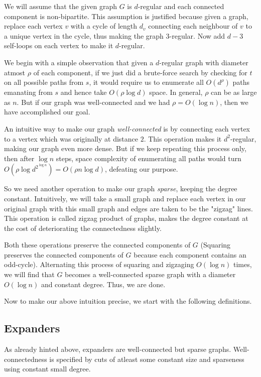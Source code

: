 \documentclass[10pt]{article}
\theoremstyle{plain}
\theoremstyle{definition}
\begin{document}
We will assume that the given graph $G$ is $d$-regular and each connected component is non-bipartite. This assumption is justified because given a graph, replace each vertex $v$ with a cycle of length $d_v$ connecting each neighbour of $v$ to a unique vertex in the cycle, thus making the graph $3$-regular. Now add $d-3$ self-loops on each vertex to make it $d$-regular.

We begin with a simple observation that given a $d$-regular graph with diameter atmost $\rho$ of each component, if we just did a brute-force search by checking for $t$ on all possible paths from $s$, it would require us to enumerate all $O(d^\rho)$ paths emanating from $s$ and hence take $O(\rho \log d)$ space. In general, $\rho$ can be as large as $n$. But if our graph was well-connected and we had $\rho = O(\log n)$, then we have accomplished our goal.

An intuitive way to make our graph \textsl{well-connected} is by connecting each vertex to a vertex which was originally at distance $2$. This operation makes it $d^2$-regular, making our graph even more dense. But if we keep repeating this process only, then after $\log n$ steps, space complexity of enumerating all paths would turn $O(\rho \log d^{2^{\log n}}) = O(\rho n \log d)$, defeating our purpose.

So we need another operation to make our graph \textsl{sparse}, keeping the degree constant. Intuitively, we will take a small graph and replace each vertex in our original graph with this small graph and edges are taken to be the "zigzag" lines. This operation is called zigzag product of graphs, makes the degree constant at the cost of deteriorating the connectedness slightly.

Both these operations preserve the connected components of $G$ (Squaring preserves the connected components of $G$ because each component contains an odd-cycle). Alternating this process of squaring and zigzaging $O(\log n)$ times, we will find that $G$ becomes a well-connected sparse graph with a diameter $O(\log n)$ and constant degree. Thus, we are done.

Now to make our above intuition precise, we start with the following definitions.

\subsection{Expanders}

As already hinted above, expanders are well-connected but sparse graphs. Well-connectedness is specified by cuts of atleast some constant size and sparseness using constant small degree.
\end{document}
